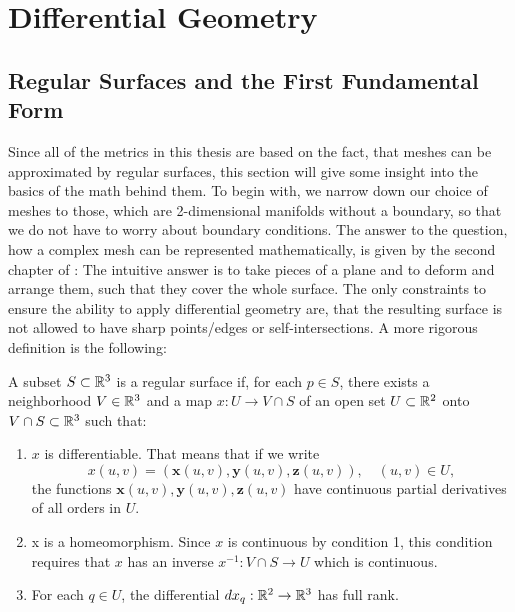 \chapter{Differential Geometry}
\label{chapter:differentialGeometry}

\section{Regular Surfaces and the First Fundamental Form}
Since all of the metrics in this thesis are based on the fact, that meshes can be approximated by regular surfaces, this section will give some insight into the basics of the math behind them.
To begin with, we narrow down our choice of meshes to those, which are 2-dimensional manifolds without a boundary, so that we do not have to worry about boundary conditions.
The answer to the question, how a complex mesh can be represented mathematically, is given by the second chapter of \cite{do1976differential}:
The intuitive answer is to take pieces of a plane and to deform and arrange them, such that they cover the whole surface.
The only constraints to ensure the ability to apply differential geometry are, that the resulting surface is not allowed to have sharp points/edges or self-intersections.
A more rigorous definition is the following:
\begin{mydef}
	A subset $S \subset \mathbb{R}^3$ is a regular surface if, for each $p \in S$, there exists a neighborhood $V \in \mathbb{R}^3$ and a map $x:U \rightarrow V \cap S$ of an open set $U \subset \mathbb{R}^2$ onto $V \cap S \subset \mathbb{R}^3$ such that:
	\begin{enumerate}
		\item $x$ is differentiable. That means that if we write
			$$x(u,v) = (\mathbf{x}(u,v), \mathbf{y}(u,v), \mathbf{z}(u,v)), \quad (u,v) \in U,$$
			the functions $\mathbf{x}(u,v), \mathbf{y}(u,v), \mathbf{z}(u,v)$ have continuous partial derivatives of all orders in $U$.
		\item x is a homeomorphism. Since $x$ is continuous by condition 1, this condition requires that $x$ has an inverse $x^{-1}: V \cap S \rightarrow U$ which is continuous.
		\item For each $q \in U$, the differential $dx_q: \mathbb{R}^2 \rightarrow \mathbb{R}^3$ has full rank.
	\end{enumerate}
\end{mydef}
